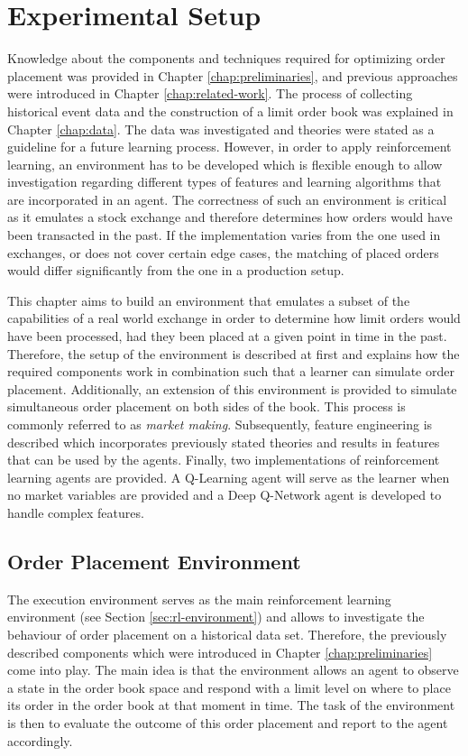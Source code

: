 \chapter{Experimental Setup}
\label{chap:setup}

Knowledge about the components and techniques required for optimizing order placement was provided in Chapter \ref{chap:preliminaries}, and previous approaches were introduced in Chapter \ref{chap:related-work}.
The process of collecting historical event data and the construction of a limit order book was explained in Chapter \ref{chap:data}.
The data was investigated and theories were stated as a guideline for a future learning process.
However, in order to apply reinforcement learning, an environment has to be developed which is flexible enough to allow investigation regarding different types of features and learning algorithms that are incorporated in an agent.
The correctness of such an environment is critical as it emulates a stock exchange and therefore determines how orders would have been transacted in the past.
If the implementation varies from the one used in exchanges, or does not cover certain edge cases, the matching of placed orders would differ significantly from the one in a production setup.

This chapter aims to build an environment that emulates a subset of the capabilities of a real world exchange in order to determine how limit orders would have been processed, had they been placed at a given point in time in the past.
Therefore, the setup of the environment is described at first and explains how the required components work in combination such that a learner can simulate order placement.
Additionally, an extension of this environment is provided
to simulate simultaneous order placement on both sides of the book.
This process is commonly referred to as \textit{market making}.
Subsequently, feature engineering is described which incorporates previously stated theories and results in features that can be used by the agents.
Finally, two implementations of reinforcement learning agents are provided.
A Q-Learning agent will serve as the learner when no market variables are provided and a Deep Q-Network agent is developed to handle complex features.


\section{Order Placement Environment}

The execution environment serves as the main reinforcement learning environment (see Section \ref{sec:rl-environment}) and allows to investigate the behaviour of order placement on a historical data set. 
Therefore, the previously described components which were introduced in Chapter \ref{chap:preliminaries} come into play.
The main idea is that the environment allows an agent to observe a state in the order book space and respond with a limit level on where to place its order in the order book at that moment in time.
The task of the environment is then to evaluate the outcome of this order placement and report to the agent accordingly.

